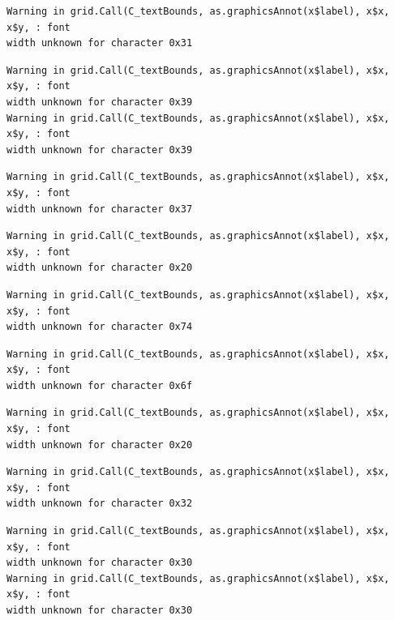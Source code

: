 \documentclass[
  letterpaper,
]{scrbook}
\begin{document}
\begin{verbatim}
Warning in grid.Call(C_textBounds, as.graphicsAnnot(x$label), x$x, x$y, : font
width unknown for character 0x31
\end{verbatim}

\begin{verbatim}
Warning in grid.Call(C_textBounds, as.graphicsAnnot(x$label), x$x, x$y, : font
width unknown for character 0x39
Warning in grid.Call(C_textBounds, as.graphicsAnnot(x$label), x$x, x$y, : font
width unknown for character 0x39
\end{verbatim}

\begin{verbatim}
Warning in grid.Call(C_textBounds, as.graphicsAnnot(x$label), x$x, x$y, : font
width unknown for character 0x37
\end{verbatim}

\begin{verbatim}
Warning in grid.Call(C_textBounds, as.graphicsAnnot(x$label), x$x, x$y, : font
width unknown for character 0x20
\end{verbatim}

\begin{verbatim}
Warning in grid.Call(C_textBounds, as.graphicsAnnot(x$label), x$x, x$y, : font
width unknown for character 0x74
\end{verbatim}

\begin{verbatim}
Warning in grid.Call(C_textBounds, as.graphicsAnnot(x$label), x$x, x$y, : font
width unknown for character 0x6f
\end{verbatim}

\begin{verbatim}
Warning in grid.Call(C_textBounds, as.graphicsAnnot(x$label), x$x, x$y, : font
width unknown for character 0x20
\end{verbatim}

\begin{verbatim}
Warning in grid.Call(C_textBounds, as.graphicsAnnot(x$label), x$x, x$y, : font
width unknown for character 0x32
\end{verbatim}

\begin{verbatim}
Warning in grid.Call(C_textBounds, as.graphicsAnnot(x$label), x$x, x$y, : font
width unknown for character 0x30
Warning in grid.Call(C_textBounds, as.graphicsAnnot(x$label), x$x, x$y, : font
width unknown for character 0x30
\end{verbatim}
\end{document}
